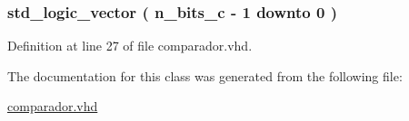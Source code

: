 \subsubsection[{comp\+\_\+int}]{ {\bfseries \textcolor{comment}{std\+\_\+logic\+\_\+vector}\textcolor{vhdlchar}{ }\textcolor{vhdlchar}{(}\textcolor{vhdlchar}{ }\textcolor{vhdlchar}{ }\textcolor{vhdlchar}{ }\textcolor{vhdlchar}{ }{\bfseries {\bf n\+\_\+bits\+\_\+c}} \textcolor{vhdlchar}{-\/}\textcolor{vhdlchar}{ } \textcolor{vhdldigit}{1} \textcolor{vhdlchar}{ }\textcolor{keywordflow}{downto}\textcolor{vhdlchar}{ }\textcolor{vhdlchar}{ } \textcolor{vhdldigit}{0} \textcolor{vhdlchar}{ }\textcolor{vhdlchar}{)}\textcolor{vhdlchar}{ }} \hspace{0.3cm}{\ttfamily [Signal]}}\label{classcomparador_1_1comparador_abf7d8be25624dd08fcc1517c8e39cb23}


Definition at line 27 of file comparador.\+vhd.



The documentation for this class was generated from the following file\+:\begin{DoxyCompactItemize}
\item 
\hyperlink{comparador_8vhd}{comparador.\+vhd}\end{DoxyCompactItemize}
